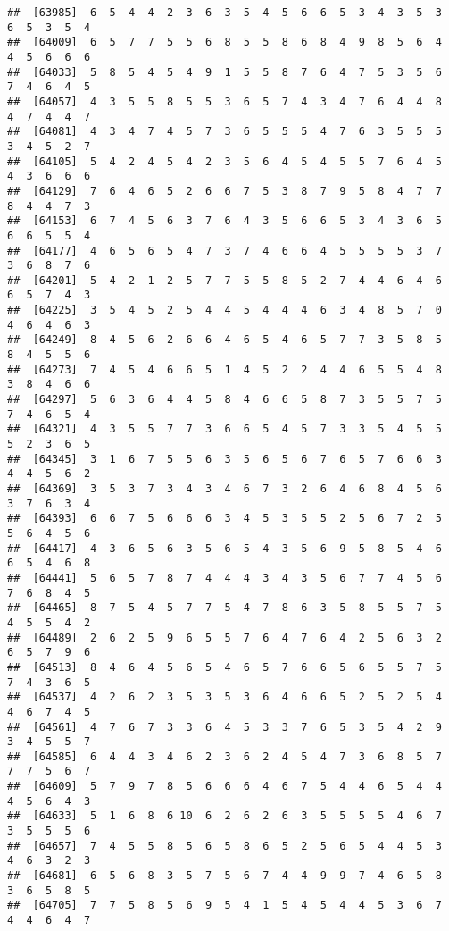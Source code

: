\documentclass[
]{book}
\begin{document}
\begin{verbatim}
##  [63985]  6  5  4  4  2  3  6  3  5  4  5  6  6  5  3  4  3  5  3  6  5  3  5  4
##  [64009]  6  5  7  7  5  5  6  8  5  5  8  6  8  4  9  8  5  6  4  4  5  6  6  6
##  [64033]  5  8  5  4  5  4  9  1  5  5  8  7  6  4  7  5  3  5  6  7  4  6  4  5
##  [64057]  4  3  5  5  8  5  5  3  6  5  7  4  3  4  7  6  4  4  8  4  7  4  4  7
##  [64081]  4  3  4  7  4  5  7  3  6  5  5  5  4  7  6  3  5  5  5  3  4  5  2  7
##  [64105]  5  4  2  4  5  4  2  3  5  6  4  5  4  5  5  7  6  4  5  4  3  6  6  6
##  [64129]  7  6  4  6  5  2  6  6  7  5  3  8  7  9  5  8  4  7  7  8  4  4  7  3
##  [64153]  6  7  4  5  6  3  7  6  4  3  5  6  6  5  3  4  3  6  5  6  6  5  5  4
##  [64177]  4  6  5  6  5  4  7  3  7  4  6  6  4  5  5  5  5  3  7  3  6  8  7  6
##  [64201]  5  4  2  1  2  5  7  7  5  5  8  5  2  7  4  4  6  4  6  6  5  7  4  3
##  [64225]  3  5  4  5  2  5  4  4  5  4  4  4  6  3  4  8  5  7  0  4  6  4  6  3
##  [64249]  8  4  5  6  2  6  6  4  6  5  4  6  5  7  7  3  5  8  5  8  4  5  5  6
##  [64273]  7  4  5  4  6  6  5  1  4  5  2  2  4  4  6  5  5  4  8  3  8  4  6  6
##  [64297]  5  6  3  6  4  4  5  8  4  6  6  5  8  7  3  5  5  7  5  7  4  6  5  4
##  [64321]  4  3  5  5  7  7  3  6  6  5  4  5  7  3  3  5  4  5  5  5  2  3  6  5
##  [64345]  3  1  6  7  5  5  6  3  5  6  5  6  7  6  5  7  6  6  3  4  4  5  6  2
##  [64369]  3  5  3  7  3  4  3  4  6  7  3  2  6  4  6  8  4  5  6  3  7  6  3  4
##  [64393]  6  6  7  5  6  6  6  3  4  5  3  5  5  2  5  6  7  2  5  5  6  4  5  6
##  [64417]  4  3  6  5  6  3  5  6  5  4  3  5  6  9  5  8  5  4  6  6  5  4  6  8
##  [64441]  5  6  5  7  8  7  4  4  4  3  4  3  5  6  7  7  4  5  6  7  6  8  4  5
##  [64465]  8  7  5  4  5  7  7  5  4  7  8  6  3  5  8  5  5  7  5  4  5  5  4  2
##  [64489]  2  6  2  5  9  6  5  5  7  6  4  7  6  4  2  5  6  3  2  6  5  7  9  6
##  [64513]  8  4  6  4  5  6  5  4  6  5  7  6  6  5  6  5  5  7  5  7  4  3  6  5
##  [64537]  4  2  6  2  3  5  3  5  3  6  4  6  6  5  2  5  2  5  4  4  6  7  4  5
##  [64561]  4  7  6  7  3  3  6  4  5  3  3  7  6  5  3  5  4  2  9  3  4  5  5  7
##  [64585]  6  4  4  3  4  6  2  3  6  2  4  5  4  7  3  6  8  5  7  7  7  5  6  7
##  [64609]  5  7  9  7  8  5  6  6  6  4  6  7  5  4  4  6  5  4  4  4  5  6  4  3
##  [64633]  5  1  6  8  6 10  6  2  6  2  6  3  5  5  5  5  4  6  7  3  5  5  5  6
##  [64657]  7  4  5  5  8  5  6  5  8  6  5  2  5  6  5  4  4  5  3  4  6  3  2  3
##  [64681]  6  5  6  8  3  5  7  5  6  7  4  4  9  9  7  4  6  5  8  3  6  5  8  5
##  [64705]  7  7  5  8  5  6  9  5  4  1  5  4  5  4  4  5  3  6  7  4  4  6  4  7

\end{verbatim}
\end{document}
